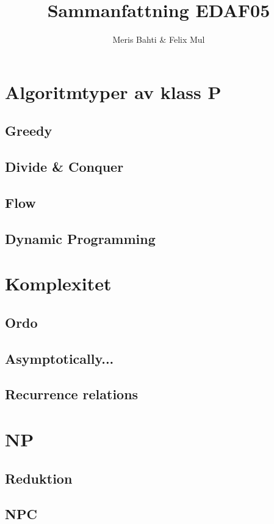 \documentclass[a4paper]{article}
\title{Sammanfattning EDAF05}
\author{Meris Bahti \& Felix Mul}
\begin{document}
\maketitle
\newpage


\section{Algoritmtyper av klass P}
\subsection{Greedy}
\subsection{Divide \& Conquer}
\subsection{Flow}
\subsection{Dynamic Programming} 

\section{Komplexitet}
\subsection{Ordo} %
\subsection{Asymptotically...} %
\subsection{Recurrence relations}

\section{NP}
\subsection{Reduktion}
\subsection{NPC} %
\end{document}
